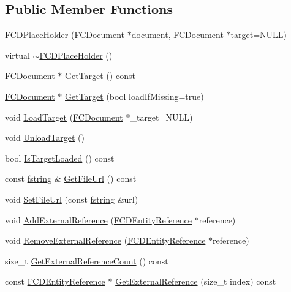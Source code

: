 \subsection*{Public Member Functions}
\begin{DoxyCompactItemize}
\item 
\hyperlink{classFCDPlaceHolder_a89409e3814ab5f30770c757e0870b92c}{FCDPlaceHolder} (\hyperlink{classFCDocument}{FCDocument} $\ast$document, \hyperlink{classFCDocument}{FCDocument} $\ast$target=NULL)
\item 
virtual \hyperlink{classFCDPlaceHolder_ae3275c7f5e8a8cae9f28090d3abd69e4}{$\sim$FCDPlaceHolder} ()
\item 
\hyperlink{classFCDocument}{FCDocument} $\ast$ \hyperlink{classFCDPlaceHolder_aa026da52db67034b464dd192bee73c76}{GetTarget} () const 
\item 
\hyperlink{classFCDocument}{FCDocument} $\ast$ \hyperlink{classFCDPlaceHolder_af95744388b5166452deb04dac26482bc}{GetTarget} (bool loadIfMissing=true)
\item 
void \hyperlink{classFCDPlaceHolder_adad22793588bc82a651b986e4ac1672d}{LoadTarget} (\hyperlink{classFCDocument}{FCDocument} $\ast$\_\-target=NULL)
\item 
void \hyperlink{classFCDPlaceHolder_a1a3cf84c054d9e32d537324fbb852799}{UnloadTarget} ()
\item 
bool \hyperlink{classFCDPlaceHolder_a1571a699d4d028acdca3fc01008d0801}{IsTargetLoaded} () const 
\item 
const \hyperlink{classfm_1_1stringT}{fstring} \& \hyperlink{classFCDPlaceHolder_a59f7e62ec7bafc88d9ad044b1e3c30f6}{GetFileUrl} () const 
\item 
void \hyperlink{classFCDPlaceHolder_a4421c1519fed33bb5df88ef957e7e8a5}{SetFileUrl} (const \hyperlink{classfm_1_1stringT}{fstring} \&url)
\item 
void \hyperlink{classFCDPlaceHolder_afbd187459ae54bb49552dd2390333818}{AddExternalReference} (\hyperlink{classFCDEntityReference}{FCDEntityReference} $\ast$reference)
\item 
void \hyperlink{classFCDPlaceHolder_a836d2418b1801b6a64f2d77f30346a42}{RemoveExternalReference} (\hyperlink{classFCDEntityReference}{FCDEntityReference} $\ast$reference)
\item 
size\_\-t \hyperlink{classFCDPlaceHolder_a1d244e772320c800125c9a43006da459}{GetExternalReferenceCount} () const 
\item 
const \hyperlink{classFCDEntityReference}{FCDEntityReference} $\ast$ \hyperlink{classFCDPlaceHolder_a77da86d97df074ef06ecb805215210f3}{GetExternalReference} (size\_\-t index) const 
\end{DoxyCompactItemize}
